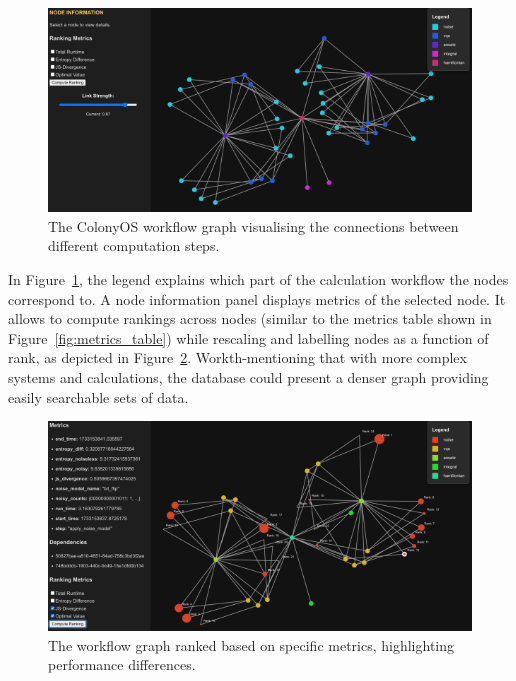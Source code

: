 \documentclass{article}
\begin{document}
\begin{figure}[htbp]
    \centering
    \includegraphics[width=1.0\linewidth]{img/graph_unfiltered.png}
    \caption{The ColonyOS workflow graph visualising the connections between different computation steps.}
    \label{fig:graph_unfiltered}
\end{figure}

In Figure~\ref{fig:graph_unfiltered}, the legend explains which part of the calculation workflow the nodes correspond to. A node information panel displays metrics of the selected node. It allows to compute rankings across nodes (similar to the metrics table shown in Figure~\ref{fig:metrics_table}) while rescaling and labelling nodes as a function of rank, as depicted in Figure~\ref{fig:graph_filtered}. Workth-mentioning that with more complex systems and calculations, the database could present a denser graph providing easily searchable sets of data.

\begin{figure}[htbp]
    \centering
    \includegraphics[width=1.0\linewidth]{img/graph_filtered.png}
    \caption{The workflow graph ranked based on specific metrics, highlighting performance differences.}
    \label{fig:graph_filtered}
\end{figure}
\end{document}
